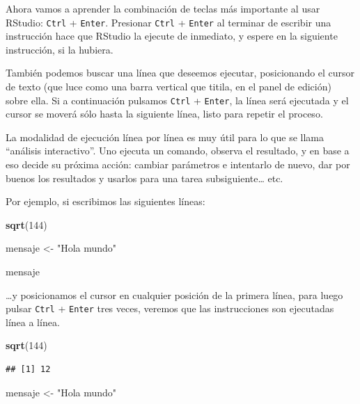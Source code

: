 \documentclass[spanish,]{book}
\newenvironment{Shaded}{\begin{snugshade}}{\end{snugshade}}
\newcommand{\DecValTok}[1]{\textcolor[rgb]{0.00,0.00,0.81}{#1}}
\newcommand{\KeywordTok}[1]{\textcolor[rgb]{0.13,0.29,0.53}{\textbf{#1}}}
\newcommand{\NormalTok}[1]{#1}
\newcommand{\StringTok}[1]{\textcolor[rgb]{0.31,0.60,0.02}{#1}}
\begin{document}
Ahora vamos a aprender la combinación de teclas más importante al usar RStudio: \texttt{Ctrl} + \texttt{Enter}. Presionar \texttt{Ctrl} + \texttt{Enter} al terminar de escribir una instrucción hace que RStudio la ejecute de inmediato, y espere en la siguiente instrucción, si la hubiera.

También podemos buscar una línea que deseemos ejecutar, posicionando el cursor de texto (que luce como una barra vertical que titila, en el panel de edición) sobre ella. Si a continuación pulsamos \texttt{Ctrl} + \texttt{Enter}, la línea será ejecutada y el cursor se moverá sólo hasta la siguiente línea, listo para repetir el proceso.

La modalidad de ejecución línea por línea es muy útil para lo que se llama ``análisis interactivo''. Uno ejecuta un comando, observa el resultado, y en base a eso decide su próxima acción: cambiar parámetros e intentarlo de nuevo, dar por buenos los resultados y usarlos para una tarea subsiguiente\ldots{} etc.

Por ejemplo, si escribimos las siguientes líneas:

\begin{Shaded}
\begin{Highlighting}[]
\KeywordTok{sqrt}\NormalTok{(}\DecValTok{144}\NormalTok{)}

\NormalTok{mensaje <-}\StringTok{ "Hola mundo"}

\NormalTok{mensaje}
\end{Highlighting}
\end{Shaded}

\ldots{}y posicionamos el cursor en cualquier posición de la primera línea, para luego pulsar \texttt{Ctrl} + \texttt{Enter} tres veces, veremos que las instrucciones son ejecutadas línea a línea.

\begin{Shaded}
\begin{Highlighting}[]
\KeywordTok{sqrt}\NormalTok{(}\DecValTok{144}\NormalTok{)}
\end{Highlighting}
\end{Shaded}

\begin{verbatim}
## [1] 12
\end{verbatim}

\begin{Shaded}
\begin{Highlighting}[]
\NormalTok{mensaje <-}\StringTok{ "Hola mundo"}
\end{Highlighting}
\end{Shaded}
\end{document}
